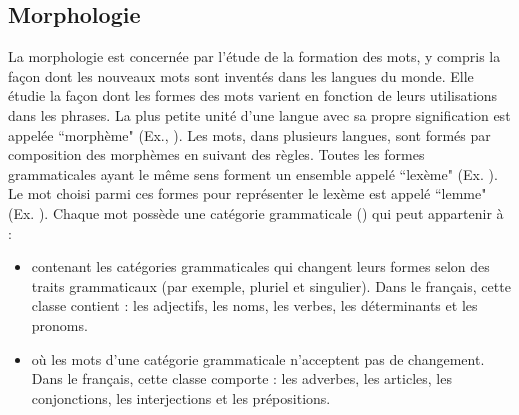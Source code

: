\documentclass{KodeBook}
\begin{document}
\subsection{Morphologie}

La morphologie est concernée par l'étude de la formation des mots, y compris la façon dont les nouveaux mots sont inventés dans les langues du monde.
Elle étudie la façon dont les formes des mots varient en fonction de leurs utilisations dans les phrases.
La plus petite unité d'une langue avec sa propre signification est appelée ``morphème" (Ex., ). 
Les mots, dans plusieurs langues, sont formés par composition des morphèmes en suivant des règles. 
Toutes les formes grammaticales ayant le même sens forment un ensemble appelé ``lexème" (Ex. ). 
Le mot choisi parmi ces formes pour représenter le lexème est appelé ``lemme" (Ex. ).
Chaque mot possède une catégorie grammaticale () qui peut appartenir à :
\begin{itemize}
	\item {} contenant les catégories grammaticales qui changent leurs formes selon des traits grammaticaux (par exemple, pluriel et singulier). 
	Dans le français, cette classe contient : les adjectifs, les noms, les verbes, les déterminants et les pronoms.
	\item {} où les mots d'une catégorie grammaticale n'acceptent pas de changement.
	Dans le français, cette classe comporte : les adverbes, les articles, les conjonctions, les interjections et les prépositions.
\end{itemize}
\end{document}
